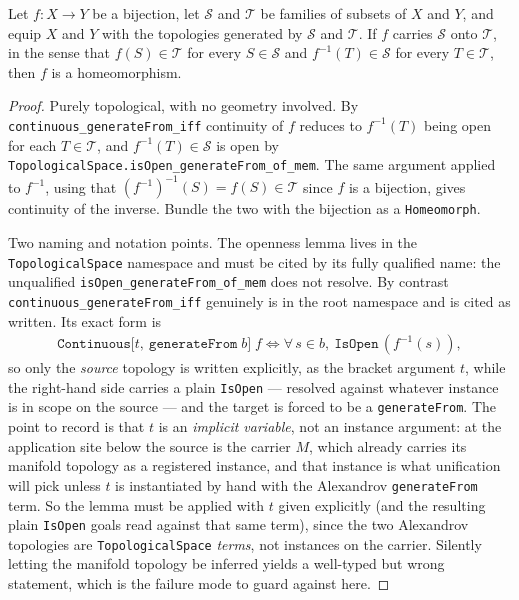 \medskip

\begin{lemma}
    \label{lmm:bijection-generated-topology-homeomorphism}
    \leanok
    Let $f : X \to Y$ be a bijection, let $\mathcal{S}$ and $\mathcal{T}$ be families of subsets of $X$ and $Y$, and equip $X$ and $Y$ with the topologies generated by $\mathcal{S}$ and $\mathcal{T}$. If $f$ carries $\mathcal{S}$ onto $\mathcal{T}$, in the sense that $f(S) \in \mathcal{T}$ for every $S \in \mathcal{S}$ and $f^{-1}(T) \in \mathcal{S}$ for every $T \in \mathcal{T}$, then $f$ is a homeomorphism.
\end{lemma}
\begin{proof}
    \leanok
    Purely topological, with no geometry involved. By \texttt{continuous\_generateFrom\_iff} continuity of $f$ reduces to $f^{-1}(T)$ being open for each $T \in \mathcal{T}$, and $f^{-1}(T) \in \mathcal{S}$ is open by \texttt{TopologicalSpace.isOpen\_generateFrom\_of\_mem}. The same argument applied to $f^{-1}$, using that $(f^{-1})^{-1}(S) = f(S) \in \mathcal{T}$ since $f$ is a bijection, gives continuity of the inverse. Bundle the two with the bijection as a \texttt{Homeomorph}.

    Two naming and notation points. The openness lemma lives in the \texttt{TopologicalSpace} namespace and must be cited by its fully qualified name: the unqualified \texttt{isOpen\_generateFrom\_of\_mem} does not resolve. By contrast \texttt{continuous\_generateFrom\_iff} genuinely is in the root namespace and is cited as written. Its exact form is
    \begin{align}
        \mathtt{Continuous[}t,\ \mathtt{generateFrom}\;b\mathtt{]}\;f \iff \forall\,s \in b,\ \mathtt{IsOpen}\,(f^{-1}(s)),
    \end{align}
    so only the \emph{source} topology is written explicitly, as the bracket argument $t$, while the right-hand side carries a plain \texttt{IsOpen} --- resolved against whatever instance is in scope on the source --- and the target is forced to be a \texttt{generateFrom}. The point to record is that $t$ is an \emph{implicit variable}, not an instance argument: at the application site below the source is the carrier $M$, which already carries its manifold topology as a registered instance, and that instance is what unification will pick unless $t$ is instantiated by hand with the Alexandrov \texttt{generateFrom} term. So the lemma must be applied with $t$ given explicitly (and the resulting plain \texttt{IsOpen} goals read against that same term), since the two Alexandrov topologies are \texttt{TopologicalSpace} \emph{terms}, not instances on the carrier. Silently letting the manifold topology be inferred yields a well-typed but wrong statement, which is the failure mode to guard against here.
\end{proof}

